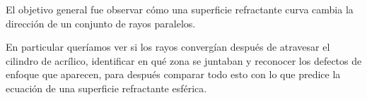 El objetivo general fue observar cómo una superficie refractante curva cambia la dirección de un conjunto de rayos paralelos.

En particular queríamos ver si los rayos convergían después de atravesar el cilindro de acrílico, identificar en qué zona se juntaban y reconocer los defectos de enfoque que aparecen, para después comparar todo esto con lo que predice la ecuación de una superficie refractante esférica.
